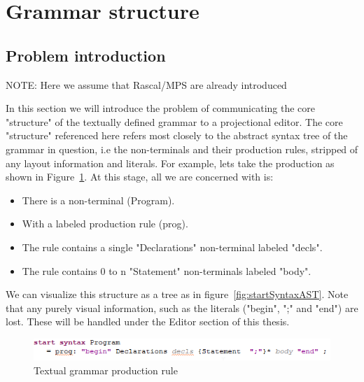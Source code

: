 \documentclass[a4paper, 11pt]{article}
\begin{document}
\section{Grammar structure}
\subsection{Problem introduction}

NOTE: Here we assume that Rascal/MPS are already introduced


In this section we will introduce the problem of communicating the core "structure" of the textually defined grammar to a projectional editor. The core "structure" referenced here refers most closely to the abstract syntax tree of the grammar in question, i.e the non-terminals and their production rules, stripped of any layout information and literals. For example, lets take the production as shown in Figure~\ref{fig:startSyntax}. At this stage, all we are concerned with is:

\begin{itemize}
	\item There is a non-terminal (Program).
	\item With a labeled production rule (prog).
	\item The rule contains a single "Declarations" non-terminal labeled "decls".
	\item The rule contains 0 to n "Statement" non-terminals labeled "body".
\end{itemize}

We can visualize this structure as a tree as in figure~\ref{fig:startSyntaxAST}. Note that any purely visual information, such as the literals ("begin", ";" and "end") are lost. These will be handled under the Editor section of this thesis.


\begin{figure}[h]
	\includegraphics[width=\linewidth]{images/StartSyntax2.png}
	\caption{Textual grammar production rule}
	\label{fig:startSyntax}
\end{figure}
\end{document}
